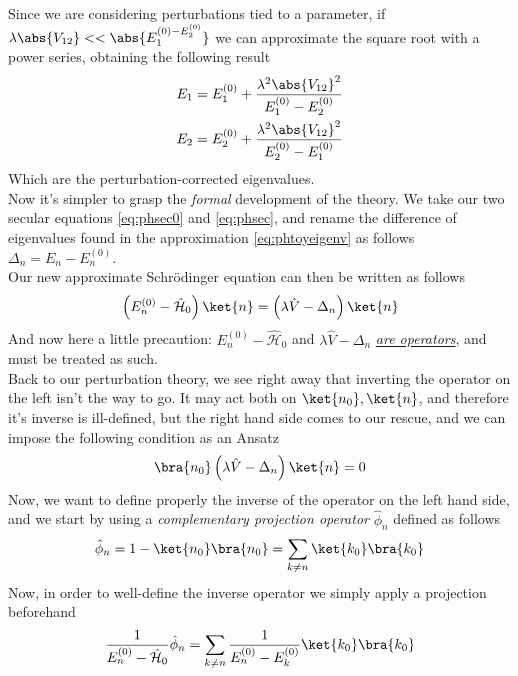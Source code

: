 \documentclass[a4paper, 11pt]{book}
\newcommand{\1}{\opr{\mathds{1}}}
\newcommand{\ham}{\mathcal{H}}
\newcommand{\opr}[1]{\hat{#1}}
\theoremstyle{plain}
\begin{document}
	Since we are considering perturbations tied to a parameter, if $\lambda\abs{V_{12}}<<\abs{E_1^{(0)-E_2^{(0)}}}$ we can approximate the square root with a power series, obtaining the following result
	\begin{equation}
		\begin{aligned}
			E_1&=E_1^{(0)}+\frac{\lambda^2\abs{V_{12}}^2}{E_1^{(0)}-E_2^{(0)}}\\
			E_2&=E_2^{(0)}+\frac{\lambda^2\abs{V_{12}}^2}{E_2^{(0)}-E_1^{(0)}}
		\end{aligned}
		\label{eq:phtoyeigenv}
	\end{equation}
	Which are the perturbation-corrected eigenvalues.\\
	Now it's simpler to grasp the \emph{formal} development of the theory. We take our two secular equations \eqref{eq:phsec0} and \eqref{eq:phsec}, and rename the difference of eigenvalues found in the approximation \eqref{eq:phtoyeigenv} as follows $\Delta_n=E_n-E_n^{(0)}$.\\
	Our new approximate Schrödinger equation can then be written as follows
	\begin{equation}
		\left( E_n^{(0)}-\opr{\ham}_0 \right)\ket{n}=\left( \lambda\opr{V}-\Delta_n \right)\ket{n}
		\label{eq:formaldefschr}
	\end{equation}
	And now here a little precaution: $E_n^{(0)}-\opr{\ham}_0$ and $\lambda\opr{V}-\Delta_n$ \underline{\emph{are operators}}, and must be treated as such.\\
	Back to our perturbation theory, we see right away that inverting the operator on the left isn't the way to go. It may act both on $\ket{n_0},\ket{n}$, and therefore it's inverse is ill-defined, but the right hand side comes to our rescue, and we can impose the following condition as an Ansatz
	\begin{equation}
		\bra{n_0}\left( \lambda\opr{V}-\Delta_n \right)\ket{n}=0
		\label{eq:rhsopcond}
	\end{equation}
	Now, we want to define properly the inverse of the operator on the left hand side, and we start by using a \textit{complementary projection operator} $\opr{\phi}_n$ defined as follows
	\begin{equation}
		\opr{\phi}_n=1-\ket{n_0}\bra{n_0}=\sum_{k\ne n}\ket{k_0}\bra{k_0}
		\label{eq:compprojop}
	\end{equation}
	Now, in order to well-define the inverse operator we simply apply a projection beforehand
	\begin{equation}
		\frac{1}{E_n^{(0)}-\opr{\ham}_0}\opr{\phi}_n=\sum_{k\ne n}\frac{1}{E_n^{(0)}-E_k^{(0)}}\ket{k_0}\bra{k_0}
		\label{eq:invlhsopr}
	\end{equation}
\end{document}
